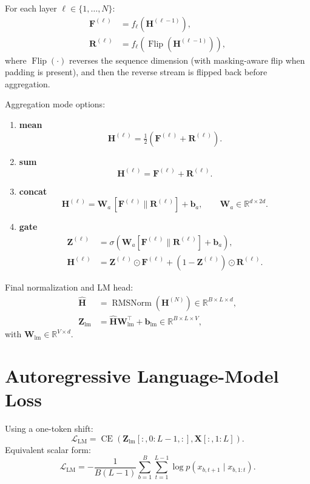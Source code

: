 \documentclass[11pt]{article}
\begin{document}
For each layer $\ell\in\{1,\dots,N\}$:
\begin{align}
\bm{F}^{(\ell)} &= f_\ell\!\left(\bm{H}^{(\ell-1)}\right),\\
\bm{R}^{(\ell)} &= f_\ell\!\left(\operatorname{Flip}(\bm{H}^{(\ell-1)})\right),
\end{align}
where $\operatorname{Flip}(\cdot)$ reverses the sequence dimension (with masking-aware flip when padding is present), and then the reverse stream is flipped back before aggregation.

Aggregation mode options:
\begin{enumerate}[leftmargin=2em,label=(\alph*)]
  \item \textbf{mean}
  \begin{equation}
  \bm{H}^{(\ell)} = \tfrac{1}{2}\left(\bm{F}^{(\ell)} + \bm{R}^{(\ell)}\right).
  \end{equation}

  \item \textbf{sum}
  \begin{equation}
  \bm{H}^{(\ell)} = \bm{F}^{(\ell)} + \bm{R}^{(\ell)}.
  \end{equation}

  \item \textbf{concat}
  \begin{equation}
  \bm{H}^{(\ell)} = \bm{W}_a\,[\bm{F}^{(\ell)}\|\bm{R}^{(\ell)}] + \bm{b}_a,
  \qquad
  \bm{W}_a\in\mathbb{R}^{d\times 2d}.
  \end{equation}

  \item \textbf{gate}
  \begin{align}
  \bm{Z}^{(\ell)} &= \sigma\!\left(\bm{W}_a[\bm{F}^{(\ell)}\|\bm{R}^{(\ell)}] + \bm{b}_a\right),\\
  \bm{H}^{(\ell)} &= \bm{Z}^{(\ell)}\odot\bm{F}^{(\ell)} + \left(1-\bm{Z}^{(\ell)}\right)\odot\bm{R}^{(\ell)}.
  \end{align}
\end{enumerate}

Final normalization and LM head:
\begin{align}
\hat{\bm{H}} &= \operatorname{RMSNorm}(\bm{H}^{(N)}) \in \mathbb{R}^{B\times L\times d},\\
\bm{Z}_{\mathrm{lm}} &= \hat{\bm{H}}\bm{W}_{\mathrm{lm}}^{\top} + \bm{b}_{\mathrm{lm}}
\in \mathbb{R}^{B\times L\times V},
\end{align}
with $\bm{W}_{\mathrm{lm}}\in\mathbb{R}^{V\times d}$.

\section{Autoregressive Language-Model Loss}
Using a one-token shift:
\begin{equation}
\mathcal{L}_{\mathrm{LM}} =
\operatorname{CE}\left(
\bm{Z}_{\mathrm{lm}}[:,0{:}L-1,:],
\bm{X}[:,1{:}L]
\right).
\end{equation}
Equivalent scalar form:
\begin{equation}
\mathcal{L}_{\mathrm{LM}} = -\frac{1}{B(L-1)}
\sum_{b=1}^{B}\sum_{t=1}^{L-1}
\log p(x_{b,t+1}\mid x_{b,1:t}).
\end{equation}
\end{document}

